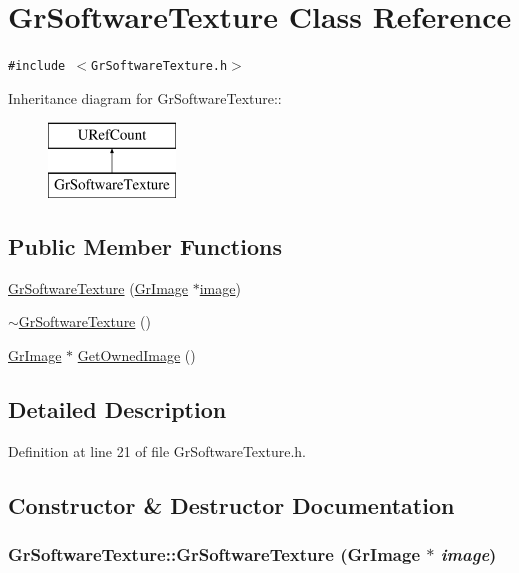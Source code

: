 \hypertarget{class_gr_software_texture}{
\section{GrSoftwareTexture Class Reference}
\label{class_gr_software_texture}
}
{\tt \#include $<$GrSoftwareTexture.h$>$}

Inheritance diagram for GrSoftwareTexture::\begin{figure}[H]
\begin{center}
\leavevmode
\includegraphics[height=2cm]{class_gr_software_texture}
\end{center}
\end{figure}
\subsection*{Public Member Functions}
\begin{CompactItemize}
\item 
\hyperlink{class_gr_software_texture_6759a008531cc71613de715c11e6191d}{GrSoftwareTexture} (\hyperlink{class_gr_image}{GrImage} $\ast$\hyperlink{glext__bak_8h_8943555672bc4b8056204eb92329cafa}{image})
\item 
\hyperlink{class_gr_software_texture_349387c7b29661c08942421f493b1987}{$\sim$GrSoftwareTexture} ()
\item 
\hyperlink{class_gr_image}{GrImage} $\ast$ \hyperlink{class_gr_software_texture_e62df5b1a2a809fc70dbdeb4c59b4310}{GetOwnedImage} ()
\end{CompactItemize}


\subsection{Detailed Description}


Definition at line 21 of file GrSoftwareTexture.h.

\subsection{Constructor \& Destructor Documentation}
\hypertarget{class_gr_software_texture_6759a008531cc71613de715c11e6191d}{
\subsubsection[{GrSoftwareTexture}]{\setlength{\rightskip}{0pt plus 5cm}GrSoftwareTexture::GrSoftwareTexture ({\bf GrImage} $\ast$ {\em image})}}
\label{class_gr_software_texture_6759a008531cc71613de715c11e6191d}




